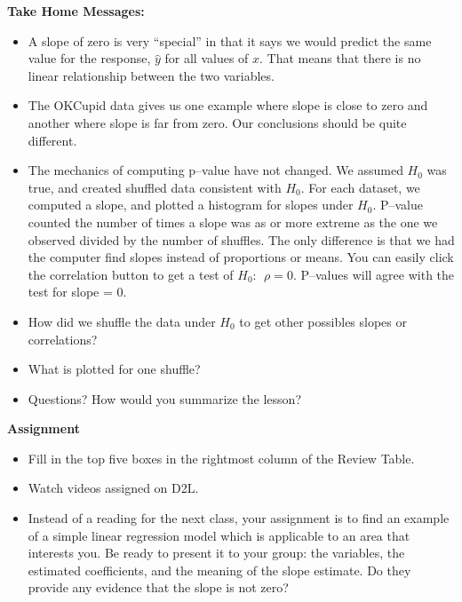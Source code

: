 \begin{center}
  {\bf Take Home Messages:}\vspace{-.4cm}
\end{center}
\begin{itemize}
  \item A slope of zero is very ``special'' in that it says we would
    predict the same value for the response, $\hat{y}$ for all values
    of $x$.  That means that there is no linear relationship between
    the two variables.
  \item The OKCupid data gives us one example where slope is close to
    zero and another where slope is far from zero.  Our conclusions
    should be quite different.
  \item The mechanics of computing p--value have not changed.  We
    assumed $H_0$ was true, and created shuffled data consistent with
    $H_0$.  For each dataset, we computed a slope, and plotted a
    histogram for slopes under $H_0$. P--value counted the number of
    times a slope was as or more extreme as the one we observed
    divided by the number of shuffles.  The only difference is that we
    had the computer find slopes instead of proportions or means.  You
    can easily click the correlation button to get a test of $H_0:\ \
    \rho = 0$. P--values will agree with the test for slope = 0.
  \item How did we shuffle the data under $H_0$ to get other possibles
    slopes or correlations?
  \item What is plotted for one shuffle?
 \item 
 Questions? How would you summarize the lesson? \vspace*{\fill}

\end{itemize}


\noindent
{\bf Assignment} \vspace{-.2in}
\begin{itemize}
\item Fill in the top five boxes in the rightmost column   of
  the Review Table.
\item Watch videos assigned on D2L.
\item Instead of a reading for the next class, your assignment is to
  find an example of a simple linear regression model which is
  applicable to an area that interests you.  Be ready to present it to
  your group:  the variables, the estimated coefficients, and the
  meaning of the slope estimate.  Do they provide any evidence that
  the slope is not zero?
\end{itemize}

